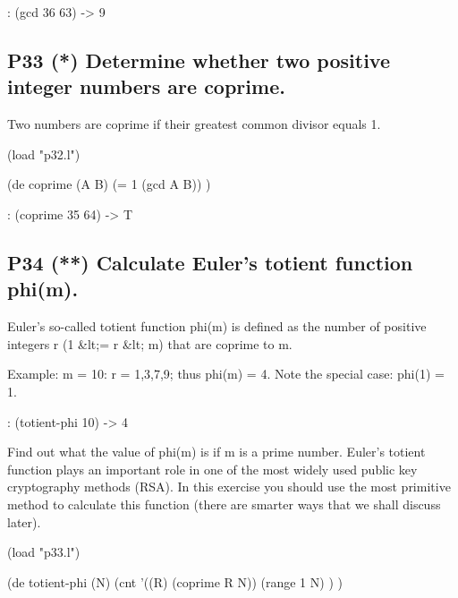 \begin{wideverbatim}
   : (gcd 36 63)
   -> 9
\end{wideverbatim}

\pagebreak{}
\subsection*{{P33} (*) Determine whether two positive
integer numbers are coprime.}
\label{sec:99-problems-P33}

Two numbers are coprime if their greatest common divisor equals 1.

\begin{wideverbatim}

(load "p32.l")

(de coprime (A B)
   (= 1 (gcd A B)) )

\end{wideverbatim}

\begin{wideverbatim}
   : (coprime 35 64)
   -> T
\end{wideverbatim}


\subsection*{{P34} (**) Calculate Euler's totient
function phi(m).}
\label{sec:99-problems-P34}

Euler's so-called totient function phi(m) is defined as the number of
positive integers r (1 \&lt;= r \&lt; m) that are coprime to m.

Example: m = 10: r = 1,3,7,9; thus phi(m) = 4. Note the special case:
phi(1) = 1.

\begin{wideverbatim}
   : (totient-phi 10)
   -> 4
\end{wideverbatim}

Find out what the value of phi(m) is if m is a prime number. Euler's
totient function plays an important role in one of the most widely used
public key cryptography methods (RSA). In this exercise you should use
the most primitive method to calculate this function (there are smarter
ways that we shall discuss later).

\begin{wideverbatim}

(load "p33.l")

(de totient-phi (N)
   (cnt
      '((R) (coprime R N))
      (range 1 N) ) )

\end{wideverbatim}

